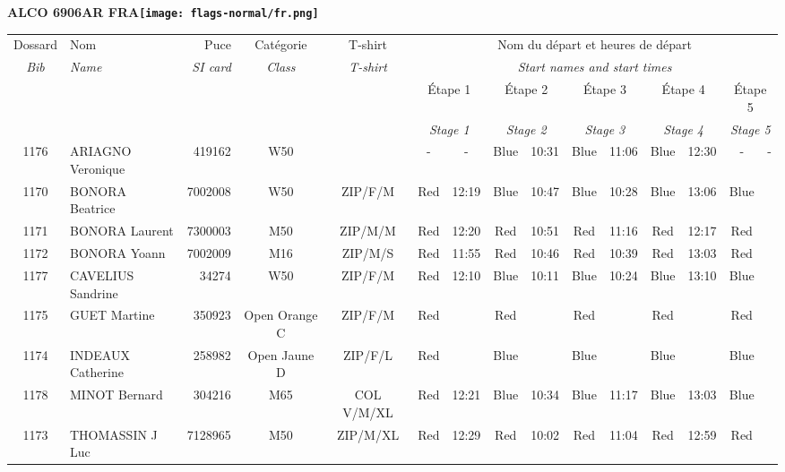 \documentclass{report}
\begin{document}
\newpage
  \Huge \centering \bfseries ALCO 6906AR FRA\normalfont \footnotesize \sffamily \hfill \texttt{[image: flags-normal/fr.png]} \newline 
  \begin{longtable}{|c|l|r|c|c|*{5}{cc|}}
    Dossard & Nom  & Puce    & Catégorie & T-shirt & \multicolumn{10}{c|}{Nom du départ et heures de départ} \\
    \itshape Bib     & \itshape Name & \itshape SI card & \itshape Class  & \itshape  T-shirt  & \multicolumn{10}{c|}{\itshape Start names and start times} \\
    \hline
    & & & & & \multicolumn{2}{c|}{Étape 1} & \multicolumn{2}{c|}{Étape 2} & \multicolumn{2}{c|}{Étape 3} & \multicolumn{2}{c|}{Étape 4} & \multicolumn{2}{c|}{Étape 5} \\
    & & & & & \multicolumn{2}{c|}{\itshape Stage 1} & \multicolumn{2}{c|}{\itshape Stage 2} & \multicolumn{2}{c|}{\itshape Stage 3} & \multicolumn{2}{c|}{\itshape Stage 4} & \multicolumn{2}{c|}{\itshape Stage 5} \\
    \hline
    1176 & ARIAGNO Veronique & 419162 & W50 &   & - &  - & Blue & 10:31 & Blue & 11:06 & Blue & 12:30 & - &  -\\
    1170 & BONORA Beatrice & 7002008 & W50 & ZIP/F/M & Red & 12:19 & Blue & 10:47 & Blue & 10:28 & Blue & 13:06 & Blue &  \\
    1171 & BONORA Laurent & 7300003 & M50 & ZIP/M/M & Red & 12:20 & Red & 10:51 & Red & 11:16 & Red & 12:17 & Red &  \\
    1172 & BONORA Yoann & 7002009 & M16 & ZIP/M/S & Red & 11:55 & Red & 10:46 & Red & 10:39 & Red & 13:03 & Red &  \\
    1177 & CAVELIUS Sandrine & 34274 & W50 & ZIP/F/M & Red & 12:10 & Blue & 10:11 & Blue & 10:24 & Blue & 13:10 & Blue &  \\
    1175 & GUET Martine & 350923 & Open Orange C & ZIP/F/M & Red &   & Red &   & Red &   & Red &   & Red &  \\
    1174 & INDEAUX Catherine & 258982 & Open Jaune D & ZIP/F/L & Red &   & Blue &   & Blue &   & Blue &   & Blue &  \\
    1178 & MINOT Bernard & 304216 & M65 & COL V/M/XL & Red & 12:21 & Blue & 10:34 & Blue & 11:17 & Blue & 13:03 & Blue &  \\
    1173 & THOMASSIN J Luc & 7128965 & M50 & ZIP/M/XL & Red & 12:29 & Red & 10:02 & Red & 11:04 & Red & 12:59 & Red &  \\
  \end{longtable}
\end{document}
